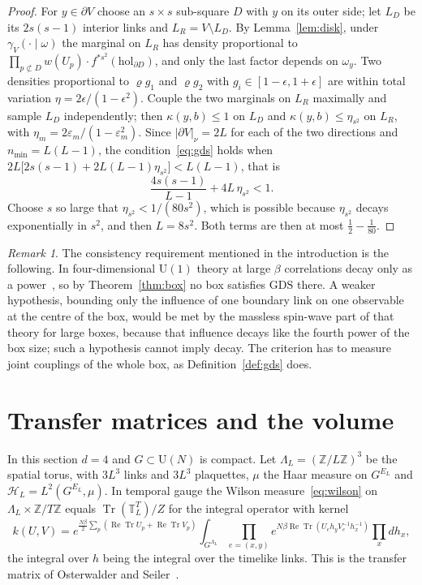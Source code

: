 \documentclass[11pt]{amsart}
\theoremstyle{definition}
\theoremstyle{remark}
\newtheorem{remark}[theorem]{Remark}
\newcommand{\Z}{\mathbb{Z}}
\newcommand{\U}{\mathrm{U}}
\newcommand{\Tr}{\operatorname{Tr}}
\newcommand{\ReTr}{\operatorname{Re}\operatorname{Tr}}
\begin{document}
\begin{proof}
For $y\in\partial V$ choose an $s\times s$ sub-square $D$ with $y$ on its outer
side; let $L_D$ be its $2s(s-1)$ interior links and $L_R=V\setminus L_D$. By
Lemma~\ref{lem:disk}, under $\gamma_V(\cdot\mid\omega)$ the marginal on $L_R$ has
density proportional to $\prod_{p\not\subset D}w(U_p)\cdot f^{*s^2}(\mathrm{hol}
_{\partial D})$, and only the last factor depends on $\omega_y$. Two densities
proportional to $\varrho g_1$ and $\varrho g_2$ with $g_i\in[1-\epsilon,1+\epsilon]$
are within total variation $\eta=2\epsilon/(1-\epsilon^2)$. Couple the two
marginals on $L_R$ maximally and sample $L_D$ independently; then
$\kappa(y,b)\le1$ on $L_D$ and $\kappa(y,b)\le\eta_{s^2}$ on $L_R$, with
$\eta_m=2\varepsilon_m/(1-\varepsilon_m^2)$. Since $|\partial V|_\nu=2L$ for
each of the two directions and $n_{\min}=L(L-1)$, the condition~\eqref{eq:gds}
holds when $2L\bigl[2s(s-1)+2L(L-1)\eta_{s^2}\bigr]<L(L-1)$, that is
\[
\frac{4s(s-1)}{L-1}+4L\,\eta_{s^2}<1 .
\]
Choose $s$ so large that $\eta_{s^2}<1/(80s^2)$, which is possible because
$\eta_{s^2}$ decays exponentially in $s^2$, and then $L=8s^2$. Both terms are
then at most $\frac12-\frac1{80}$.
\end{proof}

\begin{remark}
The consistency requirement mentioned in the introduction is the following.
In four-dimensional $\U(1)$ theory at large $\beta$ correlations decay only as
a power~\cite{Gut80,FS82}, so by Theorem~\ref{thm:box} no box satisfies
$\mathrm{GDS}$ there. A weaker hypothesis, bounding only the influence of one
boundary link on one observable at the centre of the box, would be met by the
massless spin-wave part of that theory for large boxes, because that influence
decays like the fourth power of the box size; such a hypothesis cannot imply
decay. The criterion has to measure joint couplings of the whole box, as
Definition~\ref{def:gds} does.
\end{remark}

\section{Transfer matrices and the volume}\label{sec:transfer}

In this section $d=4$ and $G\subset\U(N)$ is compact. Let $\Lambda_L=(\Z/L\Z)^3$
be the spatial torus, with $3L^3$ links and $3L^3$ plaquettes, $\mu$ the Haar
measure on $G^{E_L}$ and $\mathcal H_L=L^2(G^{E_L},\mu)$. In temporal gauge the
Wilson measure~\eqref{eq:wilson} on $\Lambda_L\times\Z/T\Z$ equals
$\Tr(\mathbb T_L^T)/Z$ for the integral operator with kernel
\[
k(U,V)=e^{\frac{N\beta}2\sum_p(\ReTr U_p+\ReTr V_p)}\int_{G^{\Lambda_L}}
\prod_{e=(x,y)}e^{N\beta\ReTr(U_eh_yV_e^{-1}h_x^{-1})}\prod_xdh_x ,
\]
the integral over $h$ being the integral over the timelike links. This is the
transfer matrix of Osterwalder and Seiler~\cite{OSei78}.
\end{document}
